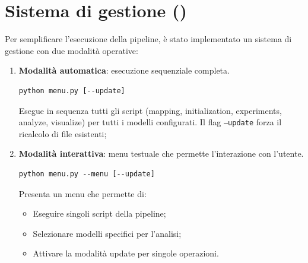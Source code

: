 \documentclass[../relazione.tex]{subfiles}
\begin{document}
\section{Sistema di gestione (\protect{})}
Per semplificare l'esecuzione della pipeline, è stato implementato un sistema di gestione con due modalità operative:

\begin{enumerate}
    \item \textbf{Modalità automatica}: esecuzione sequenziale completa.
    \begin{lstlisting}
python menu.py [--update]
    \end{lstlisting}
    Esegue in sequenza tutti gli script (mapping, initialization, experiments, analyze, visualize) per tutti i modelli configurati. Il flag \texttt{--update} forza il ricalcolo di file esistenti;
    
    \item \textbf{Modalità interattiva}: menu testuale che permette l'interazione con l'utente.
    \begin{lstlisting}
python menu.py --menu [--update]
    \end{lstlisting}
    Presenta un menu che permette di:
    \begin{itemize}
        \item Eseguire singoli script della pipeline;
        \item Selezionare modelli specifici per l'analisi;
        \item Attivare la modalità update per singole operazioni.
    \end{itemize}
\end{enumerate}
\end{document}
